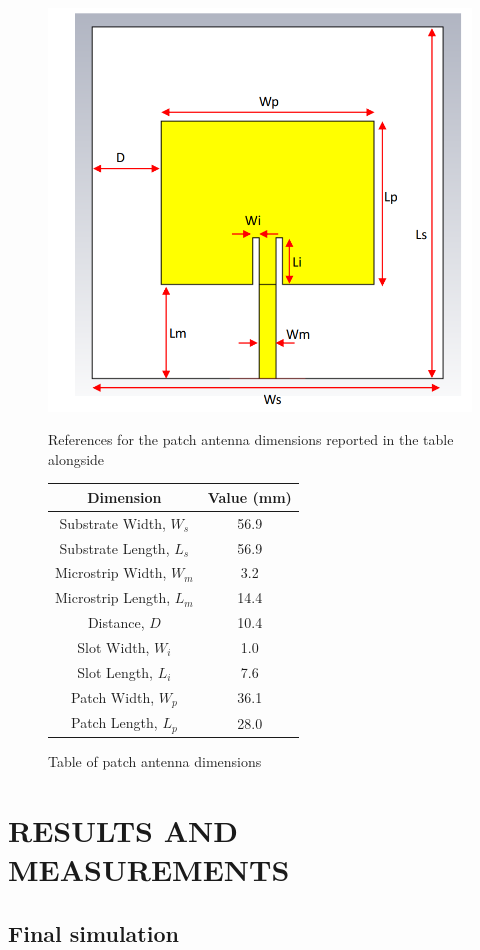 \documentclass[]{article}
\begin{document}
\begin{figure}[h]
	\centering
	\begin{minipage}{0.45\linewidth}
		\centering
		\includegraphics[width=\linewidth]{img/img11}
		\caption{References for the patch antenna dimensions reported in the table alongside}
		\label{RefPatch}
	\end{minipage}\hfill
	\begin{minipage}{0.45\linewidth}
		\centering
		\captionsetup{type=table} %
		\begin{tabular}{|c|c|}
			\hline
			\textbf{Dimension} & \textbf{Value (mm)} \\
			\hline
			Substrate Width, $W_s$ & 56.9 \\
			Substrate Length, $L_s$ & 56.9 \\
			Microstrip Width, $W_m$ & 3.2 \\
			Microstrip Length, $L_m$ & 14.4 \\
			Distance, $D$ & 10.4 \\
			Slot Width, $W_i$ & 1.0 \\
			Slot Length, $L_i$ & 7.6 \\
			Patch Width, $W_p$ & 36.1 \\
			Patch Length, $L_p$ & 28.0 \\
			\hline
		\end{tabular}
		\caption{Table of patch antenna dimensions}
		\label{tab:patchDimensions}
	\end{minipage}
\end{figure}

\newpage
\section{RESULTS AND MEASUREMENTS}
\subsection{Final simulation}
\end{document}
